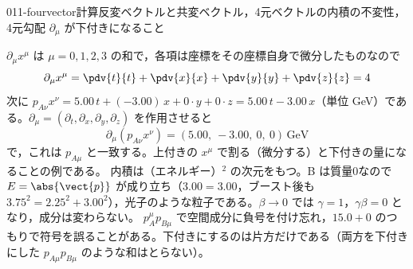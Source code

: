 \documentclass[uplatex,dvipdfmx,a4paper,11pt]{jsarticle}
\begin{document}
\begin{mondai}{011-fourvector}{計算}{反変ベクトルと共変ベクトル，4元ベクトルの内積の不変性，4元勾配 $\partial_\mu$ が下付きになること}
\begin{tadashii}
 $\partial_\mu x^\mu$ は $\mu=0,1,2,3$ の和で，各項は座標をその座標自身で微分したものなので
\[ \partial_\mu x^\mu=\pdv{t}{t}+\pdv{x}{x}+\pdv{y}{y}+\pdv{z}{z}=4 \]
次に $p_{A\nu}x^\nu=5.00\,t+(-3.00)\,x+0\cdot y+0\cdot z=5.00\,t-3.00\,x$（単位 \unit{\giga\electronvolt}）である。$\partial_\mu=(\partial_t,\partial_x,\partial_y,\partial_z)$ を作用させると
\[ \partial_\mu(p_{A\nu}x^\nu)=(5.00,\ -3.00,\ 0,\ 0)\,\unit{\giga\electronvolt} \]
で，これは $p_{A\mu}$ と一致する。上付きの $x^\mu$ で割る（微分する）と下付きの量になることの例である。
\kenzan 内積は（エネルギー）$^2$ の次元をもつ。B は質量0なので $E=\abs{\vect{p}}$ が成り立ち（$3.00=3.00$，ブースト後も $3.75^2=2.25^2+3.00^2$），光子のような粒子である。$\beta\to0$ では $\gamma=1$，$\gamma\beta=0$ となり，成分は変わらない。
\tsumazuki $p_A^\mu p_{B\mu}$ で空間成分に負号を付け忘れ，$15.0+0$ のつもりで符号を誤ることがある。下付きにするのは片方だけである（両方を下付きにした $p_{A\mu}p_{B\mu}$ のような和はとらない）。
\end{tadashii}
\end{mondai}
\end{document}
